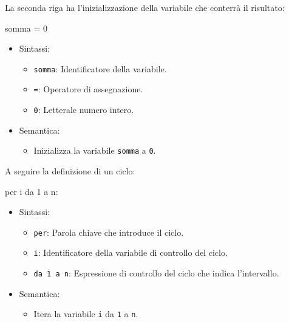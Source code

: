 \documentclass[
  letterpaper,
  DIV=11,
  numbers=noendperiod]{scrreprt}
\newenvironment{Shaded}{\begin{snugshade}}{\end{snugshade}}
\newcommand{\NormalTok}[1]{\textcolor[rgb]{0.00,0.23,0.31}{#1}}
\providecommand{\tightlist}{%
  \setlength{\itemsep}{0pt}\setlength{\parskip}{0pt}}\usepackage{longtable,booktabs,array}
\begin{document}
La seconda riga ha l'inizializzazione della variabile che conterrà il
risultato:

\begin{Shaded}
\begin{Highlighting}[]
\NormalTok{somma = 0}
\end{Highlighting}
\end{Shaded}

\begin{itemize}
\tightlist
\item
  Sintassi:

  \begin{itemize}
  \tightlist
  \item
    \texttt{somma}: Identificatore della variabile.
  \item
    \texttt{=}: Operatore di assegnazione.
  \item
    \texttt{0}: Letterale numero intero.
  \end{itemize}
\item
  Semantica:

  \begin{itemize}
  \tightlist
  \item
    Inizializza la variabile \texttt{somma} a \texttt{0}.
  \end{itemize}
\end{itemize}

A seguire la definizione di un ciclo:

\begin{Shaded}
\begin{Highlighting}[]
\NormalTok{per i da 1 a n:}
\end{Highlighting}
\end{Shaded}

\begin{itemize}
\tightlist
\item
  Sintassi:

  \begin{itemize}
  \tightlist
  \item
    \texttt{per}: Parola chiave che introduce il ciclo.
  \item
    \texttt{i}: Identificatore della variabile di controllo del ciclo.
  \item
    \texttt{da\ 1\ a\ n}: Espressione di controllo del ciclo che indica
    l'intervallo.
  \end{itemize}
\item
  Semantica:

  \begin{itemize}
  \tightlist
  \item
    Itera la variabile \texttt{i} da \texttt{1} a \texttt{n}.
  \end{itemize}
\end{itemize}
\end{document}
